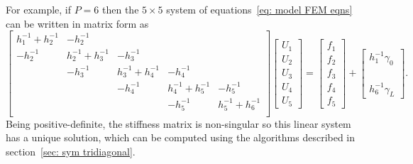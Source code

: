 For example, if $P=6$ then the $5\times 5$ system of 
equations~\eqref{eq: model FEM eqns} can be written in matrix form as
\[
\begin{bmatrix}
 h_1^{-1}+h_2^{-1}&        -h_2^{-1}&&&\\
         -h_2^{-1}&h_2^{-1}+h_3^{-1}&-h_3^{-1}&&\\
        &-h_3^{-1}&h_3^{-1}+h_4^{-1}&-h_4^{-1}&\\
       &&-h_4^{-1}&h_4^{-1}+h_5^{-1}&-h_5^{-1}\\
      &&&-h_5^{-1}&h_5^{-1}+h_6^{-1}\\
\end{bmatrix}
\begin{bmatrix}U_1\\ U_2\\ U_3\\ U_4\\ U_5\end{bmatrix}
=\begin{bmatrix}f_1\\ f_2\\ f_3\\ f_4\\ f_5\end{bmatrix}
+\begin{bmatrix}h_1^{-1}\gamma_0\\ \\ \\ \\ h_6^{-1}\gamma_L\end{bmatrix}.
\]
Being positive-definite, the stiffness matrix is non-singular so this linear 
system has a unique solution, which can be computed using the algorithms 
described in section~\ref{sec: sym tridiagonal}.

